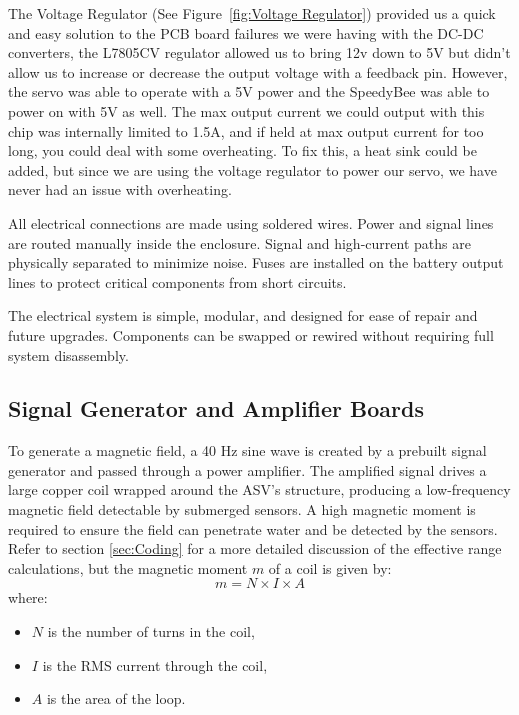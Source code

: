 The Voltage Regulator (See Figure~\ref{fig:Voltage Regulator}) provided us a quick and easy solution to the PCB board failures we were having with the DC-DC converters, the L7805CV regulator allowed us to bring 12v down to 5V but didn't allow us to increase or decrease the output voltage with a feedback pin. However, the servo was able to operate with a 5V power and the SpeedyBee was able to power on with 5V as well. The max output current we could output with this chip was internally limited to 1.5A, and if held at max output current for too long, you could deal with some overheating. To fix this, a heat sink could be added, but since we are using the voltage regulator to power our servo, we have never had an issue with overheating.

All electrical connections are made using soldered wires. Power and signal lines are routed manually inside the enclosure. Signal and high-current paths are physically separated to minimize noise. Fuses are installed on the battery output lines to protect critical components from short circuits.

The electrical system is simple, modular, and designed for ease of repair and future upgrades. Components can be swapped or rewired without requiring full system disassembly.
\subsection{Signal Generator and Amplifier Boards}

To generate a magnetic field, a 40 Hz sine wave is created by a prebuilt signal generator and passed through a power amplifier. The amplified signal drives a large copper coil wrapped around the ASV's structure, producing a low-frequency magnetic field detectable by submerged sensors. A high magnetic moment is required to ensure the field can penetrate water and be detected by the sensors. Refer to section \ref{sec:Coding} for a more detailed discussion of the effective range calculations, but the magnetic moment \( m \) of a coil is given by: 
\begin{equation}
m = N \times I \times A
\label{eq:magmoment}
\end{equation}
where:
\begin{itemize}
    \item \( N \) is the number of turns in the coil,
    \item \( I \) is the RMS current through the coil,
    \item \( A \) is the area of the loop.
\end{itemize}


